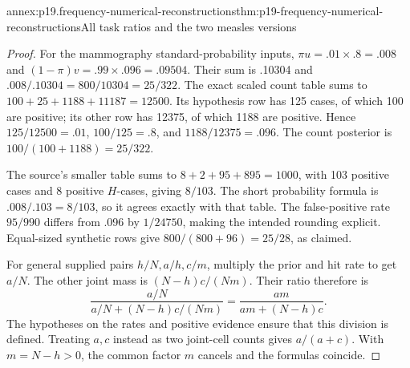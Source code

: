 \begin{annexitem}{annex:p19.frequency-numerical-reconstructions}{thm:p19-frequency-numerical-reconstructions}{All task ratios and the two measles versions}
\begin{proof}
For the mammography standard-probability inputs,
\(\pi u=.01\times.8=.008\) and
\((1-\pi)v=.99\times.096=.09504\). Their sum is .10304 and
\(.008/.10304=800/10304=25/322\). The exact scaled count table sums
to \(100+25+1188+11187=12500\). Its hypothesis row has 125 cases,
of which 100 are positive; its other row has 12375, of which 1188 are
positive. Hence \(125/12500=.01\), \(100/125=.8\), and
\(1188/12375=.096\). The count posterior is \(100/(100+1188)=25/322\).

The source's smaller table sums to \(8+2+95+895=1000\), with 103
positive cases and 8 positive \(H\)-cases, giving \(8/103\). The short
probability formula is \(.008/.103=8/103\), so it agrees exactly with
that table. The false-positive rate \(95/990\) differs from .096 by
\(1/24750\), making the intended rounding explicit. Equal-sized
synthetic rows give \(800/(800+96)=25/28\), as claimed.

For general supplied pairs \(h/N,a/h,c/m\), multiply the prior and
hit rate to get \(a/N\). The other joint mass is
\((N-h)c/(Nm)\). Their ratio therefore is
\[
 \frac{a/N}{a/N+(N-h)c/(Nm)}
 =\frac{am}{am+(N-h)c}.
\]
The hypotheses on the rates and positive evidence ensure that this division
is defined. Treating \(a,c\) instead as two joint-cell counts gives
\(a/(a+c)\). With \(m=N-h>0\), the common factor \(m\) cancels
and the formulas coincide.


\end{proof}
\end{annexitem}
